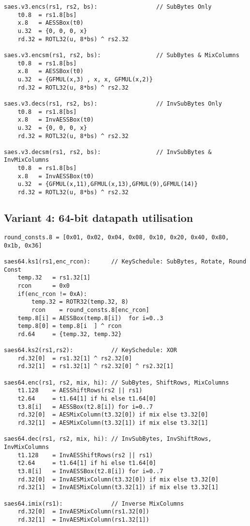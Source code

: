 \cite{MJS:20}

\begin{lstlisting}[language=pseudo,style=block]
saes.v3.encs(rs1, rs2, bs):                 // SubBytes Only
    t0.8  = rs1.8[bs]
    x.8   = AESSBox(t0)
    u.32  = {0, 0, 0, x}
    rd.32 = ROTL32(u, 8*bs) ^ rs2.32

saes.v3.encsm(rs1, rs2, bs):                // SubBytes & MixColumns
    t0.8  = rs1.8[bs]
    x.8   = AESSBox(t0)
    u.32  = {GFMUL(x,3) , x, x, GFMUL(x,2)}
    rd.32 = ROTL32(u, 8*bs) ^ rs2.32

saes.v3.decs(rs1, rs2, bs):                 // InvSubBytes Only
    t0.8  = rs1.8[bs]
    x.8   = InvAESSBox(t0)
    u.32  = {0, 0, 0, x}
    rd.32 = ROTL32(u, 8*bs) ^ rs2.32

saes.v3.decsm(rs1, rs2, bs):                // InvSubBytes & InvMixColumns
    t0.8  = rs1.8[bs]
    x.8   = InvAESSBox(t0)
    u.32  = {GFMUL(x,11),GFMUL(x,13),GFMUL(9),GFMUL(14)}
    rd.32 = ROTL32(u, 8*bs) ^ rs2.32
\end{lstlisting}

\subsection{Variant 4: 64-bit datapath utilisation}

\begin{lstlisting}[language=pseudo,style=block]
round_consts.8 = [0x01, 0x02, 0x04, 0x08, 0x10, 0x20, 0x40, 0x80, 0x1b, 0x36]

saes64.ks1(rs1,enc_rcon):      // KeySchedule: SubBytes, Rotate, Round Const
    temp.32   = rs1.32[1]
    rcon      = 0x0
    if(enc_rcon != 0xA):
        temp.32 = ROTR32(temp.32, 8)
        rcon    = round_consts.8[enc_rcon]
    temp.8[i] = AESSBox(temp.8[i])  for i=0..3
    temp.8[0] = temp.8[i  ] ^ rcon
    rd.64     = {temp.32, temp.32}

saes64.ks2(rs1,rs2):           // KeySchedule: XOR
    rd.32[0]  = rs1.32[1] ^ rs2.32[0]
    rd.32[1]  = rs1.32[1] ^ rs2.32[0] ^ rs2.32[1]

saes64.enc(rs1, rs2, mix, hi): // SubBytes, ShiftRows, MixColumns
    t1.128    = AESShiftRows(rs2 || rs1)
    t2.64     = t1.64[1] if hi else t1.64[0]
    t3.8[i]   = AESSBox(t2.8[i]) for i=0..7
    rd.32[0]  = AESMixColumn(t3.32[0]) if mix else t3.32[0]
    rd.32[1]  = AESMixColumn(t3.32[1]) if mix else t3.32[1]

saes64.dec(rs1, rs2, mix, hi): // InvSubBytes, InvShiftRows, InvMixColumns
    t1.128    = InvAESShiftRows(rs2 || rs1)
    t2.64     = t1.64[1] if hi else t1.64[0]
    t3.8[i]   = InvAESSBox(t2.8[i]) for i=0..7
    rd.32[0]  = InvAESMixColumn(t3.32[0]) if mix else t3.32[0]
    rd.32[1]  = InvAESMixColumn(t3.32[1]) if mix else t3.32[1]

saes64.imix(rs1):              // Inverse MixColumns
    rd.32[0]  = InvAESMixColumn(rs1.32[0])
    rd.32[1]  = InvAESMixColumn(rs1.32[1])
\end{lstlisting}


